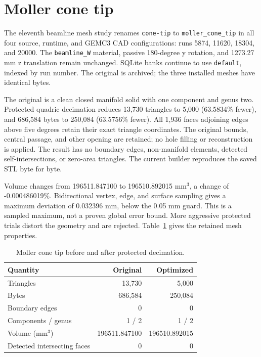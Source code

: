 \FloatBarrier
\section{Moller cone tip}
\label{sec:cone-tip}

The eleventh beamline mesh study renames \texttt{cone-tip} to \texttt{moller\_cone\_tip} in all four source,
runtime, and GEMC3 CAD configurations: runs 5874, 11620, 18304, and 20000. The \texttt{beamline\_W} material,
passive 180-degree y rotation, and 1273.27 mm z translation remain unchanged. SQLite banks continue to use
\texttt{default}, indexed by run number. The original is archived; the three installed meshes have identical
bytes.

The original is a clean closed manifold solid with one component and genus two. Protected quadric decimation
reduces 13,730 triangles to 5,000 (63.5834\% fewer), and 686,584 bytes to 250,084 (63.5756\% fewer). All 1,936
faces adjoining edges above five degrees retain their exact triangle coordinates. The original bounds, central
passage, and other opening are retained; no hole filling or reconstruction is applied. The result has no
boundary edges, non-manifold elements, detected self-intersections, or zero-area triangles. The current
builder reproduces the saved STL byte for byte.

Volume changes from 196511.847100 to 196510.892015 mm$^3$, a change of -0.000486019\%. Bidirectional vertex,
edge, and surface sampling gives a maximum deviation of 0.032396 mm, below the 0.05 mm guard. This is a
sampled maximum, not a proven global error bound. More aggressive protected trials distort the geometry and
are rejected. Table~\ref{tab:cone-tip-mesh} gives the retained mesh properties.

\begin{table}[htbp]
\centering
\caption{Moller cone tip before and after protected decimation.}
\label{tab:cone-tip-mesh}
\begin{tabular}{lrr}
\toprule
Quantity & Original & Optimized \\
\midrule
Triangles & 13,730 & 5,000 \\
Bytes & 686,584 & 250,084 \\
Boundary edges & 0 & 0 \\
Components / genus & 1 / 2 & 1 / 2 \\
Volume (mm$^3$) & 196511.847100 & 196510.892015 \\
Detected intersecting faces & 0 & 0 \\
\bottomrule
\end{tabular}
\end{table}

